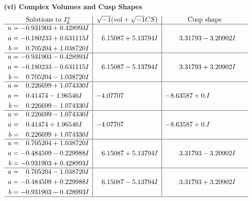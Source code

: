 \documentclass[1p]{elsarticle_modified}
\theoremstyle{definition}
\newcommand{\I}{\sqrt{-1}}
\begin{document}
\newpage\flushleft \textbf{(vi) Complex Volumes and Cusp Shapes}
$$\begin{array}{c|c|c}  
\text{Solutions to }I^u_{2}& \I (\text{vol} + \sqrt{-1}CS) & \text{Cusp shape}\\
 \hline 
\begin{aligned}
u &= -0.931903 + 0.428993 I \\
a &= -0.180233 + 0.631115 I \\
b &= \phantom{-}0.705204 + 1.038720 I\end{aligned}
 & \phantom{-}6.15087 + 5.13794 I & \phantom{-}3.31793 - 3.20902 I \\ \hline\begin{aligned}
u &= -0.931903 - 0.428993 I \\
a &= -0.180233 - 0.631115 I \\
b &= \phantom{-}0.705204 - 1.038720 I\end{aligned}
 & \phantom{-}6.15087 - 5.13794 I & \phantom{-}3.31793 + 3.20902 I \\ \hline\begin{aligned}
u &= \phantom{-}0.226699 + 1.074330 I \\
a &= \phantom{-}0.41474 - 1.96546 I \\
b &= \phantom{-}0.226699 - 1.074330 I\end{aligned}
 & -4.07707\phantom{ +0.000000I} & -8.63587 + 0. I\phantom{ +0.000000I} \\ \hline\begin{aligned}
u &= \phantom{-}0.226699 - 1.074330 I \\
a &= \phantom{-}0.41474 + 1.96546 I \\
b &= \phantom{-}0.226699 + 1.074330 I\end{aligned}
 & -4.07707\phantom{ +0.000000I} & -8.63587 + 0. I\phantom{ +0.000000I} \\ \hline\begin{aligned}
u &= \phantom{-}0.705204 + 1.038720 I \\
a &= -0.484509 - 0.229988 I \\
b &= -0.931903 + 0.428993 I\end{aligned}
 & \phantom{-}6.15087 + 5.13794 I & \phantom{-}3.31793 - 3.20902 I \\ \hline\begin{aligned}
u &= \phantom{-}0.705204 - 1.038720 I \\
a &= -0.484509 + 0.229988 I \\
b &= -0.931903 - 0.428993 I\end{aligned}
 & \phantom{-}6.15087 - 5.13794 I & \phantom{-}3.31793 + 3.20902 I\\
 \hline 
 \end{array}$$\newpage\newpage\renewcommand{\arraystretch}{1}
\end{document}
